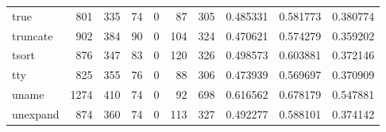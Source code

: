 \begin{longtable}{lrrrrrrrrr}
true      &                                 801 &                                             335 &                                             74 &                                             0 &                                             87 &                                          305 &                                           0.485331 &                               0.581773 &                             0.380774 \\
truncate  &                                 902 &                                             384 &                                             90 &                                             0 &                                            104 &                                          324 &                                           0.470621 &                               0.574279 &                             0.359202 \\
tsort     &                                 876 &                                             347 &                                             83 &                                             0 &                                            120 &                                          326 &                                           0.498573 &                               0.603881 &                             0.372146 \\
tty       &                                 825 &                                             355 &                                             76 &                                             0 &                                             88 &                                          306 &                                           0.473939 &                               0.569697 &                             0.370909 \\
uname     &                                1274 &                                             410 &                                             74 &                                             0 &                                             92 &                                          698 &                                           0.616562 &                               0.678179 &                             0.547881 \\
unexpand  &                                 874 &                                             360 &                                             74 &                                             0 &                                            113 &                                          327 &                                           0.492277 &                               0.588101 &                             0.374142 \\

\end{longtable}

